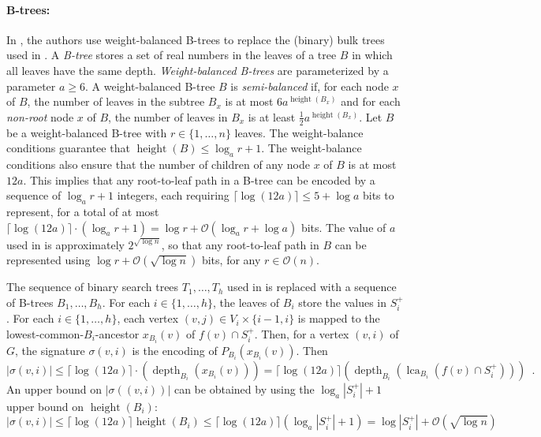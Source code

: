 \documentclass{patmorin}
\renewcommand{\ge}{\geqslant}
\renewcommand{\le}{\leqslant}
\newcommand{\pat}[1]{\noindent\textcolor{Magenta}{PaMo: #1}}
\newcommand{\defin}[1]{\emph{\textcolor{brightmaroon}{#1}}}
\DeclareMathOperator{\height}{height}
\DeclareMathOperator{\depth}{depth}
\DeclareMathOperator{\lca}{lca}
\newcommand{\Oh}{\calO}
\newcommand{\calO}{\mathcal{O}}
\begin{document}
  \paragraph{B-trees:} 
  In \cite{gawrychowski.janczewski:simpler}, the authors use weight-balanced B-trees to replace the (binary) bulk trees used in \cite{dujmovic.esperet.ea:adjacency}.
  A \defin{B-tree} stores a set of real numbers in the leaves of a tree $B$ in which all leaves have the same depth.
  \defin{Weight-balanced B-trees} are parameterized by a parameter $a\ge 6$.  A weight-balanced B-tree $B$ is \defin{semi-balanced} if, for each node $x$ of $B$, the number of leaves in the subtree $B_x$ is at most $6a^{\height(B_x)}$ and for each \emph{non-root} node $x$ of $B$, the number of leaves in $B_x$ is at least $\tfrac{1}{2}a^{\height(B_x)}$.
  Let $B$ be a weight-balanced B-tree with $r\in \{1,\ldots,n\}$ leaves.  The weight-balance conditions guarantee that $\height(B)\le \log_a r + 1$.
  The weight-balance conditions also ensure that the number of children of any node $x$ of $B$ is at most $12a$.
  This implies that any root-to-leaf path in a B-tree can be encoded by a sequence of $\log_a r+1$ integers, each requiring $\lceil\log(12a)\rceil\le 5+\log a$ bits to represent, for a total of at most $\lceil\log(12a)\rceil\cdot(\log_a r+1)=\log r + \Oh(\log_a r + \log a)$ bits.
  The value of $a$ used in \cite{gawrychowski.janczewski:simpler} is approximately $2^{\sqrt{\log n}}$, so that any root-to-leaf path in $B$ can be represented using $\log r + \Oh(\sqrt{\log n})$ bits, for any $r\in\Oh(n)$.


  The sequence of binary search trees $T_1,\ldots,T_h$ used in \cite{gawrychowski.janczewski:simpler} is replaced with a sequence of B-trees $B_1,\ldots,B_h$.
  For each $i\in\{1,\ldots,h\}$, the leaves of $B_i$ store the values in $S^+_i$.
  For each $i\in\{1,\ldots,h\}$, each vertex $(v,j)\in V_i\times\{i-1,i\}$ is mapped to the lowest-common-$B_i$-ancestor $x_{B_i}(v)$ of $f(v)\cap S^+_i$.
  Then, for a vertex $(v,i)$ of $G$, the signature \defin{$\sigma(v,i)$} is the encoding of $P_{B_i}(x_{B_i}(v))$.
  Then
  \[
    |\sigma(v,i)| \le \lceil\log (12a)\rceil\cdot(\depth_{B_i}(x_{B_i}(v))) = \lceil\log (12a)\rceil(\depth_{B_i}(\lca_{B_i}(f(v)\cap S_i^+))) \enspace .
  \]
  An upper bound on $|\sigma((v,i))|$ can be obtained by using the $\log_a |S^+_i|+1$ upper bound on $\height(B_i)$:
  \[
    |\sigma(v,i)|\le \lceil\log (12a)\rceil\height(B_i) \le \lceil\log (12a)\rceil(\log_a |S^+_i| + 1)= \log |S^+_i| + \Oh(\sqrt{\log n})
  \]
\end{document}
